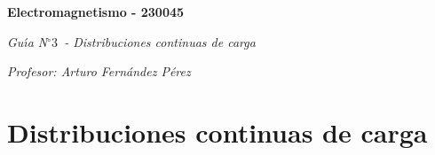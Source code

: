 \documentclass[12pt]{article}
\begin{document}
\begin{center}
\begin{equation*}
\end{equation*}%
\textbf{Electromagnetismo - 230045}

\emph{Gu\'{\i}a N}$%
{{}^\circ}%
3$\emph{\ - Distribuciones continuas de carga}

\textit{Profesor: Arturo Fern\'{a}ndez P\'{e}rez}
\end{center}

\section{Distribuciones continuas de carga}
\end{document}
